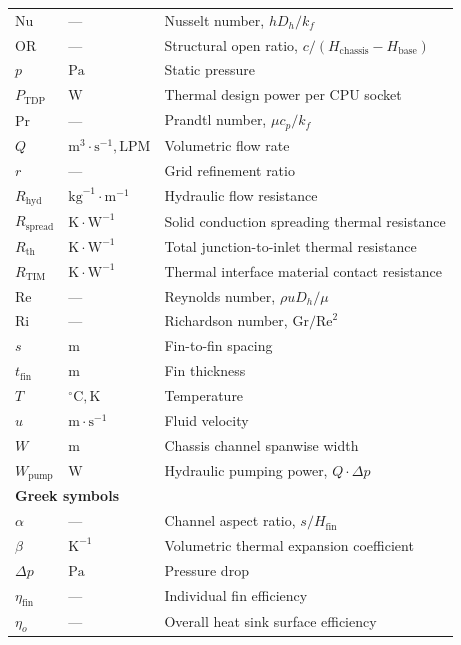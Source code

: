 \documentclass[preprint,12pt]{elsarticle}
\begin{document}
\begin{longtable}{llp{}}
$\mathrm{Nu}$ & --- & Nusselt number, $h D_h / k_f$ \\
$\mathrm{OR}$ & --- & Structural open ratio, $c / (H_{\mathrm{chassis}} - H_{\mathrm{base}})$ \\
$p$ & $\mathrm{Pa}$ & Static pressure \\
$P_{\mathrm{TDP}}$ & $\mathrm{W}$ & Thermal design power per CPU socket \\
$\mathrm{Pr}$ & --- & Prandtl number, $\mu c_p / k_f$ \\
$Q$ & $\mathrm{m}^3\cdot\mathrm{s}^{-1}, \mathrm{LPM}$ & Volumetric flow rate \\
$r$ & --- & Grid refinement ratio \\
$R_{\mathrm{hyd}}$ & $\mathrm{kg}^{-1}\cdot\mathrm{m}^{-1}$ & Hydraulic flow resistance \\
$R_{\mathrm{spread}}$ & $\mathrm{K}\cdot\mathrm{W}^{-1}$ & Solid conduction spreading thermal resistance \\
$R_{\mathrm{th}}$ & $\mathrm{K}\cdot\mathrm{W}^{-1}$ & Total junction-to-inlet thermal resistance \\
$R_{\mathrm{TIM}}$ & $\mathrm{K}\cdot\mathrm{W}^{-1}$ & Thermal interface material contact resistance \\
$\mathrm{Re}$ & --- & Reynolds number, $\rho u D_h / \mu$ \\
$\mathrm{Ri}$ & --- & Richardson number, $\mathrm{Gr}/\mathrm{Re}^2$ \\
$s$ & $\mathrm{m}$ & Fin-to-fin spacing \\
$t_{\mathrm{fin}}$ & $\mathrm{m}$ & Fin thickness \\
$T$ & $^{\circ}\mathrm{C}, \mathrm{K}$ & Temperature \\
$u$ & $\mathrm{m}\cdot\mathrm{s}^{-1}$ & Fluid velocity \\
$W$ & $\mathrm{m}$ & Chassis channel spanwise width \\
$W_{\mathrm{pump}}$ & $\mathrm{W}$ & Hydraulic pumping power, $Q \cdot \Delta p$ \\
\hline
\multicolumn{3}{l}{\textbf{Greek symbols}} \\
$\alpha$ & --- & Channel aspect ratio, $s / H_{\mathrm{fin}}$ \\
$\beta$ & $\mathrm{K}^{-1}$ & Volumetric thermal expansion coefficient \\
$\Delta p$ & $\mathrm{Pa}$ & Pressure drop \\
$\eta_{\mathrm{fin}}$ & --- & Individual fin efficiency \\
$\eta_o$ & --- & Overall heat sink surface efficiency \\

\end{longtable}
\end{document}

